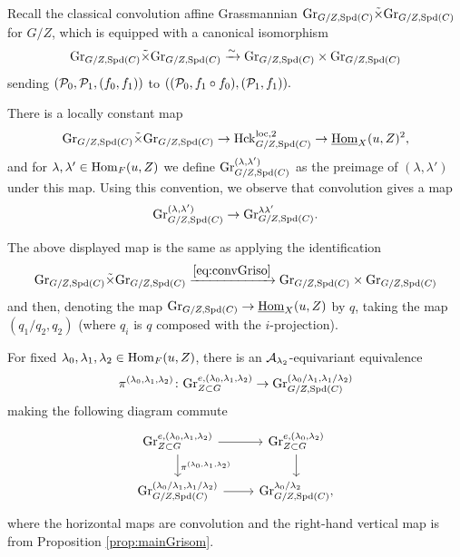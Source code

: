 Recall the classical convolution affine Grassmannian $\textnormal{Gr}_{G/Z,\mathrm{Spd}(C)} \tilde{\times} \textnormal{Gr}_{G/Z,\mathrm{Spd}(C)}$ for $G/Z$, which is equipped with a canonical isomorphism
\begin{equation}\label{eq:convGriso}
    \textnormal{Gr}_{G/Z,\mathrm{Spd}(C)} \tilde{\times} \textnormal{Gr}_{G/Z,\mathrm{Spd}(C)} \xrightarrow{\sim}  \textnormal{Gr}_{G/Z,\mathrm{Spd}(C)} \times \textnormal{Gr}_{G/Z,\mathrm{Spd}(C)}
\end{equation}
sending $(\mathcal{P}_{0}, \mathcal{P}_{1}, (f_{0},f_{1}))$ to $((\mathcal{P}_{0}, f_{1} \circ f_{0}),(\mathcal{P}_{1},f_{1})).$

There is a locally constant map
\begin{equation*}
    \textnormal{Gr}_{G/Z,\mathrm{Spd}(C)} \tilde{\times} \textnormal{Gr}_{G/Z,\mathrm{Spd}(C)} \to \mathrm{Hck}_{G/Z,\mathrm{Spd}(C)}^{\mathrm{loc},2} \to \underline{\mathrm{Hom}}_{X}(u,Z)^{2},
 \end{equation*}
and for $\lambda, \lambda' \in \mathrm{Hom}_{F}(u,Z)$ we define $\textnormal{Gr}_{G/Z,\mathrm{Spd}(C)}^{(\lambda,\lambda')}$ as the preimage of $(\lambda,\lambda')$ under this map. Using this convention, we observe that convolution gives a map
\begin{equation*}
\textnormal{Gr}_{G/Z,\mathrm{Spd}(C)}^{(\lambda,\lambda')} \to \textnormal{Gr}_{G/Z,\mathrm{Spd}(C)}^{\lambda \lambda'}.
\end{equation*}

\begin{rque} The above displayed map is the same as applying the identification 
\begin{equation*}\textnormal{Gr}_{G/Z,\mathrm{Spd}(C)} \tilde{\times} \textnormal{Gr}_{G/Z,\mathrm{Spd}(C)} \xrightarrow{\eqref{eq:convGriso}} \textnormal{Gr}_{G/Z,\mathrm{Spd}(C)} \times \textnormal{Gr}_{G/Z,\mathrm{Spd}(C)}
\end{equation*}
and then, denoting the map $\textnormal{Gr}_{G/Z,\mathrm{Spd}(C)} \to \underline{\mathrm{Hom}}_{X}(u,Z)$ by $q$, taking the map $(q_{1}/q_{2}, q_{2})$ (where $q_{i}$ is $q$ composed with the $i$-projection).
\end{rque}


\begin{lem}\label{lem:Grcompconv} For fixed $\lambda_{0}, \lambda_{1},\lambda_{2} \in \mathrm{Hom}_{F}(u,Z)$, there is an $\mathcal{A}_{\lambda_{2}}$-equivariant equivalence 
\begin{equation*}
 \pi^{(\lambda_{0},\lambda_{1},\lambda_{2})}\colon \textnormal{Gr}_{Z \subset G}^{e,(\lambda_{0},\lambda_{1},\lambda_{2})} \to \textnormal{Gr}_{G/Z,\mathrm{Spd}(C)}^{(\lambda_{0}/\lambda_{1},\lambda_{1}/\lambda_{2})}
\end{equation*}
making the following diagram commute
    \begin{equation}\label{eq:Grconvdiag}
    \begin{tikzcd}
        \tn{Gr}_{Z \subset G}^{e,(\lambda_{0},\lambda_{1},\lambda_{2})} \arrow{r} \arrow["\pi^{(\lambda_{0},\lambda_{1},\lambda_{2})}"]{d} &   \tn{Gr}_{Z \subset G}^{e,(\lambda_{0},\lambda_{2})} \arrow{d} \\
       \tn{Gr}_{G/Z,\Spd(C)}^{(\lambda_{0}/\lambda_{1},\lambda_{1}/\lambda_{2})} \arrow{r} & \tn{Gr}_{G/Z,\Spd(C)}^{\lambda_{0}/
\lambda_{2}},
    \end{tikzcd}
    \end{equation}
    where the horizontal maps are convolution and the right-hand vertical map is from Proposition \ref{prop:mainGrisom}.
    \end{lem}

